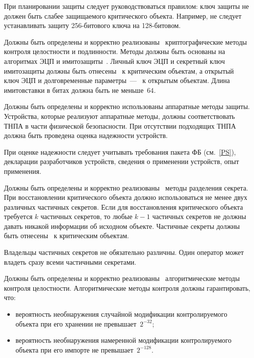 \begin{note*}
При планировании защиты следует руководствоваться правилом:
ключ защиты не должен быть слабее защищаемого критического объекта. 
%
Например, не следует устанавливать защиту 256-битового ключа на 128-битовом. 
\end{note*}

\label{R.DP.CryptoI} %
Должны быть определены и корректно 
реализованы~ 
криптографические методы контроля
целостности и подлинности. Методы должны быть основаны на алгоритмах 
ЭЦП и имитозащиты~.
%
Личный ключ ЭЦП и секретный ключ имитозащиты должны быть 
отнесены~ к критическим объектам, а открытый ключ ЭЦП и 
долговременные параметры~--- ~к открытым объектам.
%
Длина имитовставки в битах должна быть не меньше~$64$.

\label{R.DP.Hard} %
Должны быть определены и корректно использованы аппаратные методы защиты.
Устройства, которые реализуют аппаратные методы, 
должны соответствовать ТНПА в части физической безопасности.
%
При отсутствии подходящих ТНПА должна быть проведена оценка надежности
устройств.

\begin{note*}
При оценке надежности следует учитывать требования пакета ФБ (см.~\ref{PS}),
декларации разработчиков устройств, сведения о применении устройств, опыт
применения.
\end{note*}

\label{R.DP.Split} %
Должны быть определены и корректно
реализованы~  методы разделения
секрета. При восстановлении критического объекта должно использоваться не менее
двух различных частичных секретов.
%
Если для восстановления критического объекта требуется $k$ частичных секретов,
то любые $k-1$ частичных секретов не должны давать никакой информации об 
исходном объекте.
%
Частичные секреты должны быть отнесены~ к критическим объектам.

\begin{note*}
Владельцы частичных секретов не обязательно различны. 
Один оператор может владеть сразу всеми частичными секретами.
\end{note*}

\label{R.DP.Algo} %
Должны быть определены и корректно 
реализованы~ алгоритмические методы 
контроля целостности.
%
Алгоритмические методы контроля должны гарантировать, что:
\begin{itemize}
\item
вероятность необнаружения случайной модификации контролируемого 
объекта при его хранении не превышает~$2^{-32}$;
\item
вероятность необнаружения намеренной модификации контролируемого 
объекта при его импорте не превышает~$2^{-128}$.
\end{itemize}

